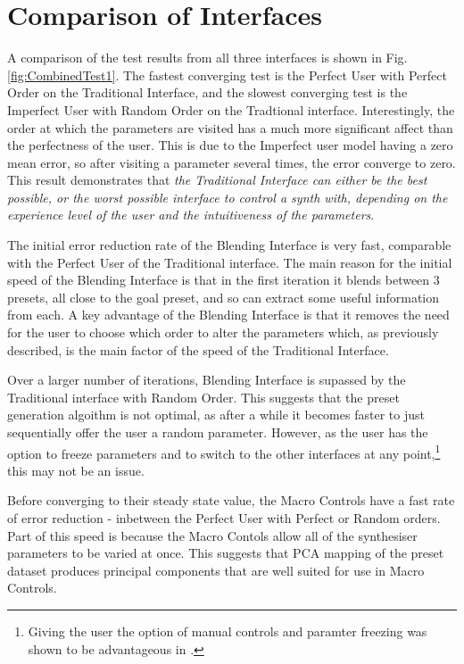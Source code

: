 \documentclass[11pt, oneside]{report}   	%
\begin{document}
\section{Comparison of Interfaces}
A comparison of the test results from all three interfaces is shown in Fig. \ref{fig:CombinedTest1}.  
The fastest converging test is the Perfect User with Perfect Order on the Traditional Interface, and the slowest converging test is the Imperfect User with Random Order on the Tradtional interface. Interestingly, the order at which the parameters are visited has a much more significant affect than the perfectness of the user. This is due to the Imperfect user model having a zero mean error, so after visiting a parameter several times, the error converge to zero. This result demonstrates that \emph{the Traditional Interface can either be the best possible, or the worst possible interface to control a synth with, depending on the experience level of the user and the intuitiveness of the parameters}.

The initial error reduction rate of the Blending Interface is very fast, comparable with the Perfect User of the Traditional interface. The main reason for the initial speed of the Blending Interface is that in the first iteration it blends between 3 presets, all close to the goal preset, and so can extract some useful information from each.
A key advantage of the Blending Interface is that it removes the need for the user to choose which order to alter the parameters which, as previously described, is the main factor of the speed of the Traditional Interface.

 Over a larger number of iterations, Blending Interface is supassed by the Traditional interface with Random Order. This suggests that the preset generation algoithm is not optimal, as after a while it becomes faster to just sequentially offer the user a random parameter. However, as the user has the option to freeze parameters and to switch to the other interfaces at any point,\footnote{Giving the user the option of manual controls and paramter freezing was shown to be advantageous in \cite{PreferenceGallery}.} this may not be an issue. 
 
Before converging to their steady state value, the Macro Controls have a fast rate of error reduction - inbetween the Perfect User with Perfect or Random orders. Part of this speed is because the Macro Contols allow all of the synthesiser parameters to be varied at once. This suggests that PCA mapping of the preset dataset produces principal components that are well suited for use in Macro Controls.
\end{document}
